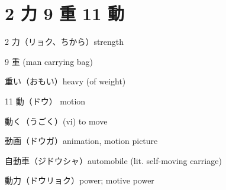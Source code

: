 \section{2 力 9 重 11 動}

2 力（リョク、ちから）strength

9 重 (man carrying bag)

重い（おもい）heavy (of weight)

11 動（ドウ） motion

動く（うごく）(vi) to move

動画（ドウガ）animation, motion picture

自動車（ジドウシャ）automobile (lit. self-moving carriage)

動力（ドウリョク）power; motive power
